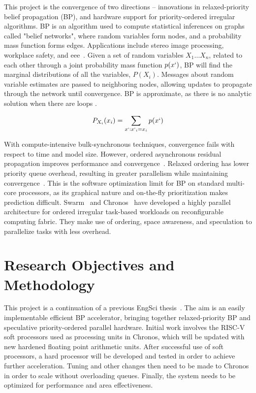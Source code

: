 This project is the convergence of two directions -- innovations in relaxed-priority belief propagation (BP), and hardware support for priority-ordered irregular algorithms. BP is an algorithm used to compute statistical inferences on graphs called "belief networks", where random variables form nodes, and a probability mass function forms edges. Applications include stereo image processing, workplace safety, and eee~\cite{Yan_Yang_Yang_Zhao_2023, Chen_McCabe_Hyatt_2017}. Given a set of random variables ${X_1 \ldots X_n}$, related to each other through a joint probability mass function $p(x`)$, BP will find the marginal distributions of all the variables, $P(X_i)$. Messages about random variable estimates are passed to neighboring nodes, allowing updates to propagate through the network until convergence. BP is approximate, as there is no analytic solution when there are loops \cite{Bishop_2006}.

\[ P_{X_i}(x_i) = \sum_{x`:x`_i=x_i} p(x`) \]

With compute-intensive bulk-synchronous techniques, convergence fails with respect to time and model size. However, ordered asynchronous residual propagation improves performance and convergence~\cite{Elidan_McGraw_Koller_2012}. Relaxed ordering has lower priority queue overhead, resulting in greater parallelism while maintaining convergence~\cite{Aksenov_Alistarh_Korhonen_2021}. This is the software optimization limit for BP on standard multi-core processors, as its graphical nature and on-the-fly prioritization makes prediction difficult. Swarm~\cite{Jeffrey_2019} and Chronos~\cite{Abeydeera_Sanchez_2020} have
developed a highly parallel architecture for ordered irregular task-based workloads on reconfigurable computing fabric. They make use of ordering, space awareness, and speculation to parallelize tasks with less overhead. 

\section*{Research Objectives and Methodology}

This project is a continuation of a previous EngSci thesis~\cite{Han_2023}. The aim is an easily implementable efficient BP accelerator, bringing together relaxed-priority BP and speculative priority-ordered parallel hardware. Initial work involves the RISC-V soft processors used as processing units in Chronos, which will be updated with new hardened floating point arithmetic units. After successful use of soft processors, a hard processor will be developed and tested in order to achieve further acceleration. Tuning and other changes then need to be made to Chronos in order to scale without overloading queues. Finally, the system needs to be optimized for performance and area effectiveness. 

